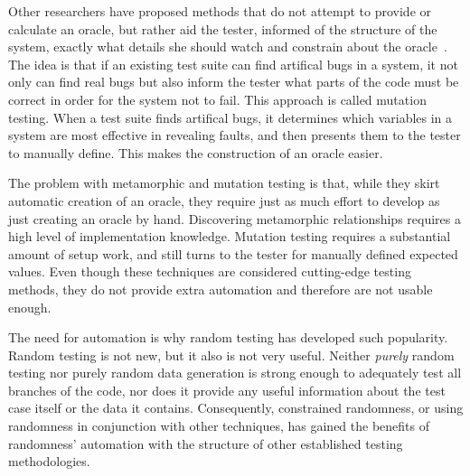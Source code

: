 Other researchers have proposed methods that do not attempt to provide or calculate an oracle, but rather aid the tester, informed of the structure of the system, exactly what details she should watch and constrain about the oracle~\cite{Patrick:2016:ATI:2970276.2970333,Souza:2016:SMT:2897010.2897012,Harman:2011:SHO:2025113.2025144,Staats:2012:AOC:2337223.2337326}. The idea is that if an existing test suite can find artifical bugs in a system, it not only can find real bugs but also inform the tester what parts of the code must be correct in order for the system not to fail. This approach is called mutation testing. When a test suite finds artifical bugs, it determines which variables in a system are most effective in revealing faults, and then presents them to the tester to manually define. This makes the construction of an oracle easier.

The problem with metamorphic and mutation testing is that, while they skirt automatic creation of an oracle, they require just as much effort to develop as just creating an oracle by hand. Discovering metamorphic relationships requires a high level of implementation knowledge. Mutation testing requires a substantial amount of setup work, and still turns to the tester for manually defined expected values. Even though these techniques are considered cutting-edge testing methods, they do not provide extra automation and therefore are not usable enough.

The need for automation is why random testing has developed such popularity. Random testing is not new, but it also is not very useful. Neither \textit{purely} random testing nor purely random data generation is strong enough to adequately test all branches of the code, nor does it provide any useful information about the test case itself or the data it contains. Consequently, constrained randomness, or using randomness in conjunction with other techniques, has gained the benefits of randomness' automation with the structure of other established testing methodologies.

